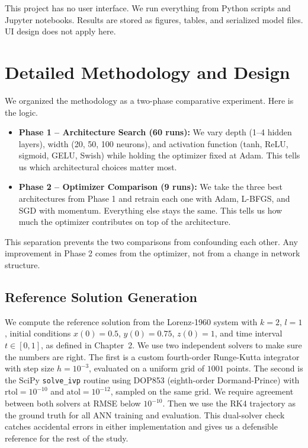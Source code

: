 This project has no user interface. We run everything from Python scripts and Jupyter notebooks. Results are stored as figures, tables, and serialized model files. UI design does not apply here.

\section{Detailed Methodology and Design}

We organized the methodology as a two-phase comparative experiment. Here is the logic.

\begin{itemize}
    \item \textbf{Phase 1 -- Architecture Search (60 runs):} We vary depth (1--4 hidden layers), width (20, 50, 100 neurons), and activation function (tanh, ReLU, sigmoid, GELU, Swish) while holding the optimizer fixed at Adam. This tells us which architectural choices matter most.
    \item \textbf{Phase 2 -- Optimizer Comparison (9 runs):} We take the three best architectures from Phase 1 and retrain each one with Adam, L-BFGS, and SGD with momentum. Everything else stays the same. This tells us how much the optimizer contributes on top of the architecture.
\end{itemize}

This separation prevents the two comparisons from confounding each other. Any improvement in Phase 2 comes from the optimizer, not from a change in network structure.

\subsection{Reference Solution Generation}

We compute the reference solution from the Lorenz-1960 system with $k=2$, $l=1$, initial conditions $x(0)=0.5$, $y(0)=0.75$, $z(0)=1$, and time interval $t \in [0, 1]$, as defined in Chapter~2. We use two independent solvers to make sure the numbers are right. The first is a custom fourth-order Runge-Kutta integrator with step size $h=10^{-3}$, evaluated on a uniform grid of $1001$ points. The second is the SciPy \texttt{solve\_ivp} routine using DOP853 (eighth-order Dormand-Prince) with $\text{rtol}=10^{-10}$ and $\text{atol}=10^{-12}$, sampled on the same grid. We require agreement between both solvers at RMSE below $10^{-10}$. Then we use the RK4 trajectory as the ground truth for all ANN training and evaluation. This dual-solver check catches accidental errors in either implementation and gives us a defensible reference for the rest of the study.

